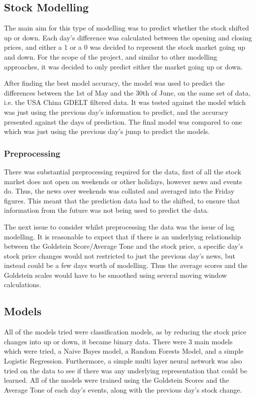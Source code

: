 \subsection{Stock Modelling}

The main aim for this type of modelling was to predict whether the stock shifted up or down. Each day's difference was calculated between the opening and closing prices, and either a 1 or a 0 was decided to represent the stock market going up and down. For the scope of the project, and similar to other modelling approaches, it was decided to only predict either the market going up or down.

After finding the best model accuracy, the model was used to predict the differences between the 1st of May and the 30th of June, on the same set of data, i.e. the USA China GDELT filtered data. It was tested against the model which was just using the previous day's information to predict, and the accuracy presented against the days of prediction. The final model was compared to one which was just using the previous day's jump to predict the models. 

\subsubsection{Preprocessing}
There was substantial preprocessing required for the data, first of all the stock market does not open on weekends or other holidays, however news and events do. Thus, the news over weekends was collated and averaged into the Friday figures. This meant that the prediction data had to the shifted, to ensure that information from the future was not being used to predict the data.

The next issue to consider whilst preprocessing the data was the issue of lag modelling. It is reasonable to expect that if there is an underlying relationship between the Goldstein Score/Average Tone and the stock price, a specific day's stock price changes would not restricted to just the previous day's news, but instead could be a few days worth of modelling. Thus the average scores and the Goldstein scales would have to be smoothed using several moving window calculations.

\subsection{Models}
All of the models tried were classification models, as by reducing the stock price changes into up or down, it became binary data. There were 3 main models which were tried, a Naive Bayes model, a Random Forests Model, and a simple Logistic Regression. Furthermore, a simple multi layer neural network was also tried on the data to see if there was any underlying representation that could be learned. All of the models were trained using the Goldstein Scores and the Average Tone of each day's events, along with the previous day's stock change. 

